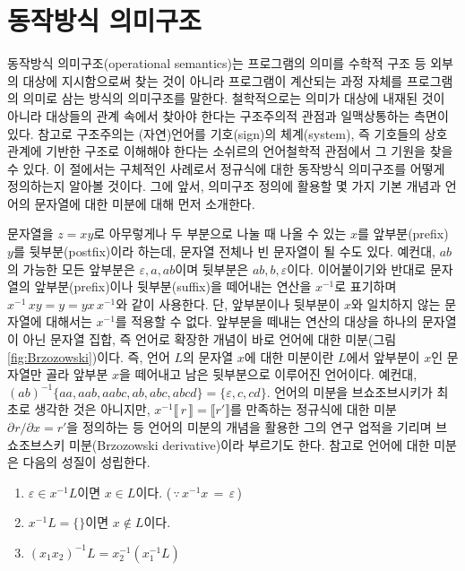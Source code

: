 \documentclass[b5paper,chapter,figtabcapt]{oblivoir}
\providecommand{\tightlist}{%
      \setlength{\itemsep}{0pt}\setlength{\parskip}{0pt}}
\begin{document}
\section{동작방식 의미구조}
동작방식 의미구조(operational semantics)는
프로그램의 의미를 수학적 구조 등 외부의 대상에 지시함으로써 찾는 것이
아니라 프로그램이 계산되는 과정 자체를 프로그램의 의미로 삼는 방식의
의미구조를 말한다. 철학적으로는 의미가 대상에 내재된 것이 아니라 대상들의
관계 속에서 찾아야 한다는 구조주의적 관점과 일맥상통하는 측면이 있다.
참고로 구조주의는 (자연)언어를 기호(sign)의 체계(system), 즉 기호들의
상호관계에 기반한 구조로 이해해야 한다는 소쉬르\cite{Saussure1916}의
언어철학적 관점에서 그 기원을 찾을 수 있다. 이 절에서는 구체적인
사례로서 정규식에 대한 동작방식 의미구조를 어떻게 정의하는지 알아볼
것이다. 그에 앞서, 의미구조 정의에 활용할 몇 가지 기본 개념과
언어의 문자열에 대한 미분에 대해 먼저 소개한다.

문자열을 $z=xy$로 아무렇게나 두 부분으로 나눌 때 나올 수 있는
$x$를 앞부분(prefix) $y$를 뒷부분(postfix)이라 하는데,
문자열 전체나 빈 문자열이 될 수도 있다. 예컨대, $ab$의 가능한 모든
앞부분은 $\varepsilon,a,ab$이며 뒷부분은 $ab,b,\varepsilon$이다.
이어붙이기와 반대로 문자열의 앞부분(prefix)이나 뒷부분(suffix)을
떼어내는 연산을 $x^{-1}$로 표기하며 $x^{-1}\,xy = y = yx\,x^{-1}$와
같이 사용한다. 단, 앞부분이나 뒷부분이 $x$와 일치하지 않는 문자열에
대해서는 $x^{-1}$를 적용할 수 없다. 앞부분을 떼내는 연산의 대상을
하나의 문자열이 아닌 문자열 집합, 즉 언어로 확장한 개념이 바로 언어에
대한 미분(그림\;\ref{fig:Brzozowski})이다.
즉, 언어 $L$의 문자열 $x$에 대한 미분이란 $L$에서 앞부분이 $x$인
문자열만 골라 앞부분 $x$을 떼어내고 남은 뒷부분으로 이루어진 언어이다.
예컨대, $(ab)^{-1} \{aa,aab,aabc,ab,abc,abcd\} = \{\varepsilon, c, cd\}$.
언어의 미분을 브쇼조브시키가 최초로 생각한 것은 아니지만,
$x^{-1} \llbracket\,r\,\rrbracket = \llbracket r' \rrbracket$를
만족하는 정규식에 대한 미분 $\partial_{}r/\partial x = r'$을
정의하는 등 언어의 미분의 개념을 활용한 그의 연구 업적을 기리며
브쇼조브스키 미분(Brzozowski derivative)이라 부르기도 한다.
참고로 언어에 대한 미분은 다음의 성질이 성립한다.
\begin{enumerate}\tightlist
 \item $\varepsilon \in x^{-1} L$이면 $x\in L$이다.
      ($\,\because\, x^{-1}x \,=\, \varepsilon\,$)
 \item $x^{-1} L = \{\}$이면 $x\notin L$이다.
 \item $(x_1x_2)^{-1} L = x_2^{-1}(x_1^{-1} L)$
\end{enumerate}
\end{document}
